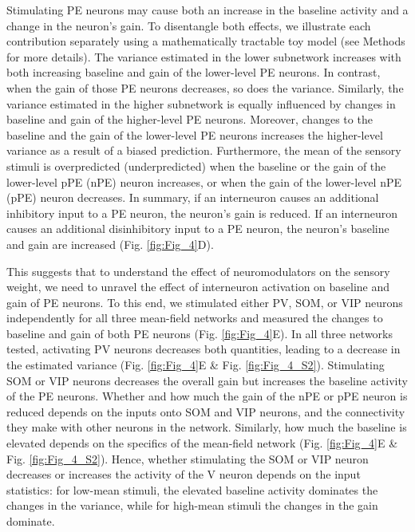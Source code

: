 \documentclass[10pt,a4paper]{article}
\begin{document}
Stimulating PE neurons may cause both an increase in the baseline activity and a change in the neuron's gain. To disentangle both effects, we illustrate each contribution separately using a mathematically tractable toy model (see Methods for more details). The variance estimated in the lower subnetwork increases with both increasing baseline and gain of the lower-level PE neurons. In contrast, when the gain of those PE neurons decreases, so does the variance. Similarly, the variance estimated in the higher subnetwork is equally influenced by changes in baseline and gain of the higher-level PE neurons. Moreover, changes to the baseline and the gain of the lower-level PE neurons increases the higher-level variance as a result of a biased prediction. Furthermore, the mean of the sensory stimuli is overpredicted (underpredicted) when the baseline or the gain of the lower-level pPE (nPE) neuron increases, or when the gain of the lower-level nPE (pPE) neuron decreases. In summary, if an interneuron causes an additional inhibitory input to a PE neuron, the neuron's gain is reduced. If an interneuron causes an additional disinhibitory input to a PE neuron, the neuron's baseline and gain are increased (Fig. \ref{fig:Fig_4}D).

This suggests that to understand the effect of neuromodulators on the sensory weight, we need to unravel the effect of interneuron activation on baseline and gain of PE neurons. To this end, we stimulated either PV, SOM, or VIP neurons independently for all three mean-field networks and measured the changes to baseline and gain of both PE neurons (Fig. \ref{fig:Fig_4}E). In all three networks tested, activating PV neurons decreases both quantities, leading to a decrease in the estimated variance (Fig. \ref{fig:Fig_4}E \& Fig. \ref{fig:Fig_4_S2}). Stimulating SOM or VIP neurons decreases the overall gain but increases the baseline activity of the PE neurons. Whether and how much the gain of the nPE or pPE neuron is reduced depends on the inputs onto SOM and VIP neurons, and the connectivity they make with other neurons in the network. Similarly, how much the baseline is elevated depends on the specifics of the mean-field network (Fig. \ref{fig:Fig_4}E \& Fig. \ref{fig:Fig_4_S2}). Hence, whether stimulating the SOM or VIP neuron decreases or increases the activity of the V neuron depends on the input statistics: for low-mean stimuli, the elevated baseline activity dominates the changes in the variance, while for high-mean stimuli the changes in the gain dominate. 
\end{document}
